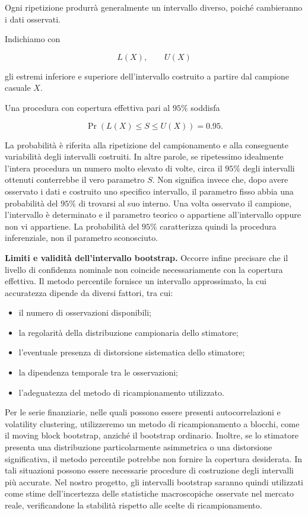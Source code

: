 Ogni ripetizione produrrà generalmente
un intervallo diverso, poiché cambieranno
i dati osservati.

Indichiamo con

\[
L(X),\qquad U(X)
\]

gli estremi inferiore e superiore
dell'intervallo costruito a partire
dal campione casuale $X$.

Una procedura con copertura effettiva pari al $95\%$ soddisfa

\[
\boxed{
\Pr\left(L(X)\leq S\leq U(X)\right)=0.95.
}
\]

La probabilità è riferita alla ripetizione del campionamento e alla conseguente variabilità degli intervalli costruiti.
In altre parole, se ripetessimo idealmente l'intera procedura un numero molto elevato di volte, circa il $95\%$ degli intervalli ottenuti 
conterrebbe il vero parametro $S$. Non significa invece che, dopo avere osservato i dati e costruito uno specifico intervallo, il parametro 
fisso abbia una probabilità del $95\%$ di trovarsi al suo interno. Una volta osservato il campione, l'intervallo è determinato e il parametro 
teorico o appartiene all'intervallo oppure non vi appartiene. La probabilità del $95\%$ caratterizza quindi la procedura inferenziale, 
non il parametro sconosciuto.
\medskip

\noindent
\textbf{Limiti e validità dell'intervallo bootstrap.}
Occorre infine precisare che il livello di confidenza nominale non coincide necessariamente con la copertura effettiva.
Il metodo percentile fornisce un intervallo approssimato, la cui accuratezza dipende da diversi fattori, tra cui:

\begin{itemize}
    \item il numero di osservazioni disponibili;

    \item la regolarità della distribuzione
    campionaria dello stimatore;

    \item l'eventuale presenza di distorsione
    sistematica dello stimatore;

    \item la dipendenza temporale tra
    le osservazioni;

    \item l'adeguatezza del metodo
    di ricampionamento utilizzato.
\end{itemize}

Per le serie finanziarie, nelle quali possono essere presenti autocorrelazioni e volatility clustering, utilizzeremo un metodo di ricampionamento a 
blocchi, come il moving block bootstrap, anziché il bootstrap ordinario. Inoltre, se lo stimatore presenta una distribuzione particolarmente 
asimmetrica o una distorsione significativa, il metodo percentile potrebbe non fornire la copertura desiderata. In tali situazioni possono essere 
necessarie procedure di costruzione degli intervalli più accurate. Nel nostro progetto, gli intervalli bootstrap saranno quindi utilizzati come stime 
dell'incertezza delle statistiche macroscopiche osservate nel mercato reale, verificandone la stabilità rispetto alle scelte di ricampionamento.


